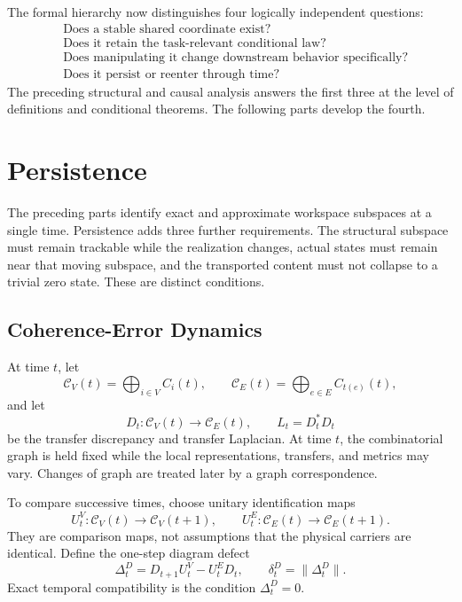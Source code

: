 \begin{SRWTremark}
The formal hierarchy now distinguishes four logically independent questions:
\[
\begin{aligned}
&\text{Does a stable shared coordinate exist?}\\
&\text{Does it retain the task-relevant conditional law?}\\
&\text{Does manipulating it change downstream behavior specifically?}\\
&\text{Does it persist or reenter through time?}
\end{aligned}
\]
The preceding structural and causal analysis answers the first three at the level of definitions and conditional
theorems. The following parts develop the fourth.
\end{SRWTremark}


\chapter{Persistence}\label{SRWT:book:chapter-76}


The preceding parts identify exact and approximate workspace subspaces at a
single time. Persistence adds three further requirements. The structural
subspace must remain trackable while the realization changes, actual states
must remain near that moving subspace, and the transported content must not
collapse to a trivial zero state. These are distinct conditions.

\section{Coherence-Error Dynamics}


At time \(t\), let
\[
\mathcal C_V(t)=\bigoplus_{i\in V}C_i(t),
\qquad
\mathcal C_E(t)=\bigoplus_{e\in E}C_{t(e)}(t),
\]
and let
\[
D_t:\mathcal C_V(t)\longrightarrow\mathcal C_E(t),
\qquad
L_t=D_t^*D_t
\]
be the transfer discrepancy and transfer Laplacian. At time \(t\), the
combinatorial graph is held fixed while the local representations, transfers,
and metrics may vary. Changes of graph are treated later by a graph
correspondence.

To compare successive times, choose unitary identification maps
\[
U_t^V:\mathcal C_V(t)\longrightarrow\mathcal C_V(t+1),
\qquad
U_t^E:\mathcal C_E(t)\longrightarrow\mathcal C_E(t+1).
\]
They are comparison maps, not assumptions that the physical carriers are
identical. Define the one-step diagram defect
\[
\boxed{
\Delta_t^D
=
D_{t+1}U_t^V-U_t^ED_t,
\qquad
\delta_t^D=\|\Delta_t^D\|.
}
\]
Exact temporal compatibility is the condition \(\Delta_t^D=0\).

